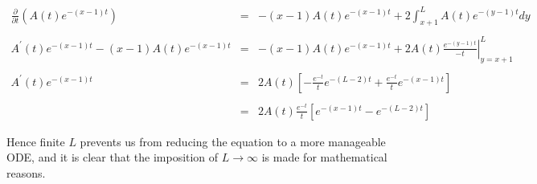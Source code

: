 \begin{eqnarray*}
			\frac{\partial}{\partial t} (A(t) e^{-(x - 1)t}) & = & -(x - 1) A(t) e^{-(x - 1)t} + 2 \int_{x + 1}^{L} A(t) e^{-(y - 1)t} dy \\\\
	A^{\prime}(t) e^{-(x - 1)t} - (x - 1) A(t) e^{-(x - 1)t} & = & -(x - 1) A(t) e^{-(x - 1)t} + 2 A(t) \left. \frac{e^{-(y - 1)t}}{-t} \right|_{y = x + 1}^{L} \\\\
								 A^{\prime}(t) e^{-(x - 1)t} & = & 2 A(t) \left[ -\frac{e^{-t}}{t} e^{-(L - 2)t} + \frac{e^{-t}}{t} e^{-(x - 1)t} \right] \\\\
															 & = & 2 A(t) \frac{e^{-t}}{t} \left[ e^{-(x - 1)t} - e^{-(L - 2)t} \right]
\end{eqnarray*}\medskip

Hence finite $L$ prevents us from reducing the equation to a more manageable ODE, and it is clear 
that the imposition of $L \to \infty$ is made for mathematical reasons. \bigskip











